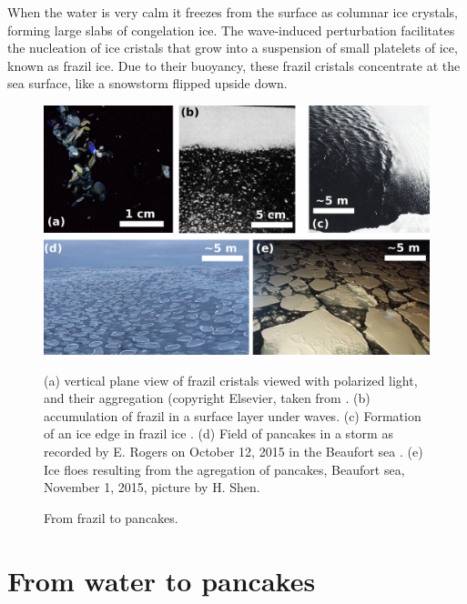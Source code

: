 When the water is very calm it freezes from the surface as columnar ice crystals, forming large slabs of congelation ice. The wave-induced perturbation facilitates the nucleation of ice cristals that grow into a suspension of small platelets of ice, known as frazil ice.  Due to their buoyancy, these frazil cristals concentrate at the sea surface, like a snowstorm flipped upside down. 

\begin{figure}[htb]
\centerline{\includegraphics[width=\textwidth]{FIGS_CH_ICE/ice_frazil_pancakes.jpg}}
  \caption{From frazil to pancakes.}{(a) vertical plane view of frazil cristals viewed with polarized light, and their aggregation (copyright Elsevier, taken from \cite{McFarlane&al.2015}. (b) accumulation of frazil in a surface layer under waves. (c) Formation of an ice edge in frazil ice \citep[From][, copyright Cambridge University Press]{Martin&Kauffman1981}. (d) Field of pancakes in a storm as recorded by E. Rogers on October 12, 2015 in the Beaufort sea \citep{Rogers&al.2016}. (e) Ice floes resulting from the agregation of pancakes, Beaufort sea, November 1, 2015, picture by H. Shen.} \label{fig:frazil_pancakes}
\end{figure}


\section{From water to pancakes}
